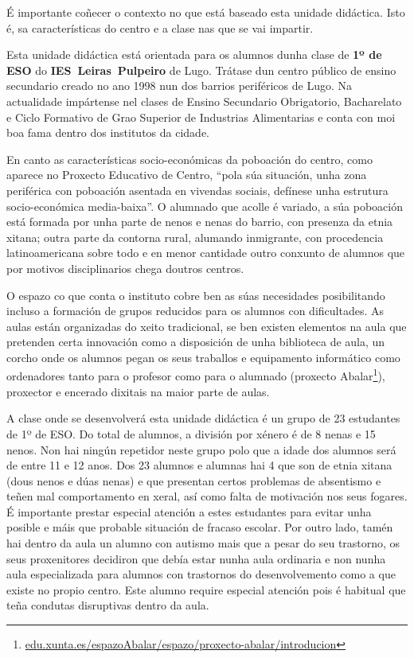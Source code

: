 
É importante coñecer o contexto no que está baseado esta unidade didáctica. Isto é, sa características do centro e a clase nas que se vai impartir.

Esta unidade didáctica está orientada para os alumnos dunha clase de \textbf{1º de ESO} do \textbf{IES~Leiras~Pulpeiro} de Lugo. Trátase dun centro público de ensino secundario creado no ano 1998 nun dos barrios periféricos de Lugo. Na actualidade impártense nel clases de Ensino Secundario Obrigatorio, Bacharelato e Ciclo Formativo de Grao Superior de Industrias Alimentarias e conta con moi boa fama dentro dos institutos da cidade.

En canto as características socio-económicas da poboación do centro, como aparece no Proxecto Educativo de Centro, ``pola súa situación, unha zona periférica con poboación asentada en vivendas sociais, defínese unha estrutura socio-económica media-baixa''. O alumnado que acolle é variado, a súa poboación está formada por unha parte de nenos e nenas do barrio, con presenza da etnia xitana; outra parte da contorna rural, alumando inmigrante, con procedencia latinoamericana sobre todo e en menor cantidade outro conxunto de alumnos que por motivos disciplinarios chega doutros centros.

 O espazo co que conta o instituto cobre ben as súas necesidades posibilitando incluso a formación de grupos reducidos para os alumnos con dificultades. As aulas están organizadas do xeito tradicional, se ben existen elementos na aula que pretenden certa innovación como a disposición de unha biblioteca de aula, un corcho onde os alumnos pegan os seus traballos e equipamento informático como ordenadores tanto para o profesor como para o alumnado (proxecto Abalar\footnote{\href{https://www.edu.xunta.es/espazoAbalar/espazo/proxecto-abalar/introducion}{edu.xunta.es/espazoAbalar/espazo/proxecto-abalar/introducion}}), proxector e encerado dixitais na maior parte de aulas.

A clase onde se desenvolverá esta unidade didáctica é un grupo de 23 estudantes de 1º de ESO. Do total de alumnos, a división por xénero é de 8 nenas e 15 nenos. Non hai ningún repetidor neste grupo polo que a idade dos alumnos será de entre 11 e 12 anos. Dos 23 alumnos e alumnas hai 4 que son de etnia xitana (dous nenos e dúas nenas) e que presentan certos problemas de absentismo e teñen mal comportamento en xeral, así como falta de motivación nos seus fogares. É importante prestar especial atención a estes estudantes para evitar unha posible e máis que probable situación de fracaso escolar. Por outro lado, tamén hai dentro da aula un alumno con autismo mais que a pesar do seu trastorno, os seus proxenitores decidiron que debía estar nunha aula ordinaria e non nunha aula especializada para alumnos con trastornos do desenvolvemento como a que existe no propio centro. Este alumno require especial atención pois é habitual que teña condutas disruptivas dentro da aula.

